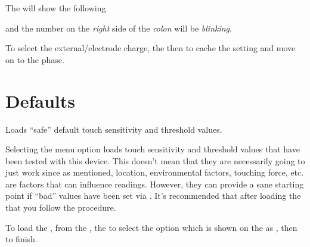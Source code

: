 The  will show the following


and the number on the \textit{right} side of the \textit{colon} will be
\textit{blinking}.

\par\medskip

To select the external\slash electrode charge,  the  then 
to cache the setting and move on to the \hyperref[Touch Calibration]{}
phase.


\section{Defaults} 

Loads ``safe'' default touch sensitivity and threshold values.

\par\medskip

Selecting the  menu option loads touch sensitivity and threshold
values that have been tested with this device.  This doesn't mean that they are
necessarily going to just work since as mentioned, location, environmental
factors, touching force, etc. are factors that can influence readings.
However, they can provide a sane starting point if ``bad'' values have been set
via .  It's recommended that after loading the  that you
follow the \hyperref[Touch Calibration]{} procedure.

\par\medskip

To load the , from the \hyperref[Touch - Menu]{}, 
the  to select the option which is shown on the  as
, then  to finish.


\pagebreak
